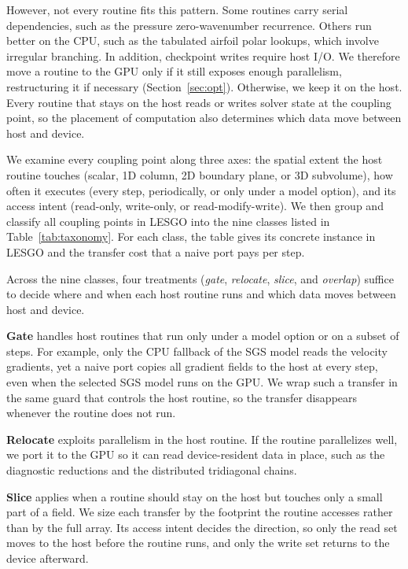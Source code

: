 However, not every routine fits this pattern. Some
routines carry serial dependencies, such as the pressure
zero-wavenumber recurrence. Others run better on the CPU, such as the
tabulated airfoil polar lookups, which involve irregular branching. In
addition, checkpoint writes require host I/O. We therefore move a routine
to the GPU only if it still exposes enough parallelism, restructuring it
if necessary (Section~\ref{sec:opt}). Otherwise, we keep it on the
host. Every routine that stays on the host reads or writes solver
state at the coupling point, so the placement of computation also
determines which data move between host and device.

We examine every coupling point along three axes: the spatial extent
the host routine touches (scalar, 1D column, 2D boundary plane, or 3D
subvolume), how often it executes (every step, periodically, or only
under a model option), and its access intent (read-only, write-only, or
read-modify-write). We then group and classify all coupling points in
LESGO into the nine classes listed in Table~\ref{tab:taxonomy}. For
each class, the table gives its concrete instance in LESGO and the
transfer cost that a naive port pays per step.

Across the nine classes, four treatments
(\emph{gate}, \emph{relocate}, \emph{slice}, and \emph{overlap}) suffice
to decide where and when each host routine runs and which data moves between
host and device. 

\vspace{0.08in}
\noindent\textbf{Gate} handles host routines that run only under a model option or
on a subset of steps. For example, only the CPU fallback of the SGS
model reads the velocity gradients, yet a naive port copies all
gradient fields to the host at every step, even when the selected SGS
model runs on the GPU. We wrap such a transfer in the same guard that
controls the host routine, so the transfer disappears whenever the
routine does not run.

\vspace{0.08in}
\noindent\textbf{Relocate} exploits parallelism in the host routine. If the
routine parallelizes well, we port it to the GPU so it can read
device-resident data in place, such as the diagnostic reductions
and the distributed tridiagonal chains. 

\vspace{0.08in}
\noindent\textbf{Slice} applies when a routine should stay on the host but
touches only a small part of a field. We size each transfer by the
footprint the routine accesses rather than by the full array. Its
access intent decides the direction, so only the read set moves to the
host before the routine runs, and only the write set returns to the
device afterward. 

